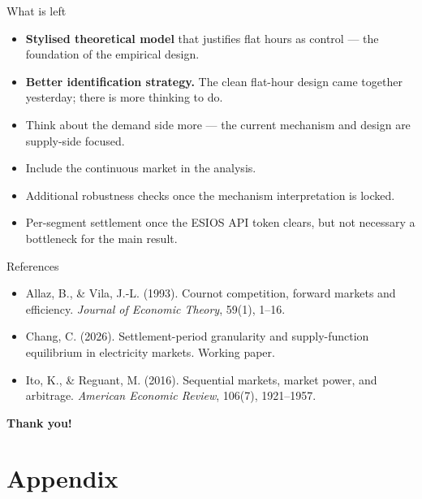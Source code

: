 \documentclass[10pt,aspectratio=169]{beamer}
\begin{document}
\begin{frame}{What is left}
  \footnotesize
  \begin{itemize}
    \item \textbf{Stylised theoretical model} that justifies flat hours as control --- the foundation of the empirical design.
    \item \textbf{Better identification strategy.} The clean flat-hour design came together yesterday; there is more thinking to do.
    \item Think about the demand side more --- the current mechanism and design are supply-side focused.
    \item Include the continuous market in the analysis.
    \item Additional robustness checks once the mechanism interpretation is locked.
    \item Per-segment settlement once the ESIOS API token clears, but not necessary a bottleneck for the main result.
  \end{itemize}
\end{frame}

\begin{frame}{References}
  \footnotesize
  \begin{itemize}
    \item Allaz, B., \& Vila, J.-L. (1993). Cournot competition, forward markets and efficiency. \emph{Journal of Economic Theory}, 59(1), 1--16.
    \item Chang, C. (2026). Settlement-period granularity and supply-function equilibrium in electricity markets. Working paper.
    \item Ito, K., \& Reguant, M. (2016). Sequential markets, market power, and arbitrage. \emph{American Economic Review}, 106(7), 1921--1957.
  \end{itemize}
\end{frame}

\begin{frame}[plain]
  \begin{center}
    \vspace{2cm}
    {\Large \textbf{Thank you!}}
  \end{center}
\end{frame}


\section{Appendix}
\end{document}

